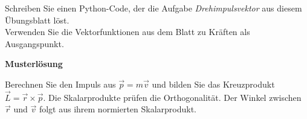 \begin{ExerciseBlock}
Schreiben Sie einen Python-Code, der die Aufgabe \textit{Drehimpulsvektor} aus diesem Übungsblatt löst. \\

Verwenden Sie die Vektorfunktionen aus dem Blatt zu Kräften als Ausgangspunkt.
\end{ExerciseBlock}

\begin{Solution}
\par\medskip\noindent\textbf{Musterlösung}\par\nopagebreak[4]
Berechnen Sie den Impuls aus $\vec p=m\vec v$ und bilden Sie das Kreuzprodukt $\vec L=\vec r\times\vec p$. Die Skalarprodukte prüfen die Orthogonalität. Der Winkel zwischen $\vec r$ und $\vec v$ folgt aus ihrem normierten Skalarprodukt.
\end{Solution}
